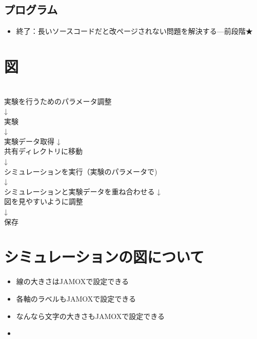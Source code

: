 	\subsection{プログラム}
		\begin{itemize}
		  \item 終了：長いソースコードだと改ページされない問題を解決する---前段階★
		\end{itemize}
\section{図}
 \ \\
 実験を行うためのパラメータ調整\\
 ↓\\
 実験\\
 ↓\\
 実験データ取得
 ↓\\ 
 共有ディレクトリに移動\\
 ↓\\
 シミュレーションを実行（実験のパラメータで)\\
 ↓\\
 シミュレーションと実験データを重ね合わせる
 ↓\\
 図を見やすいように調整\\
 ↓\\
 保存\\
 
 \section{シミュレーションの図について}
 \begin{itemize}
   \item 線の大きさはJAMOXで設定できる
   \item 各軸のラベルもJAMOXで設定できる
   \item なんなら文字の大きさもJAMOXで設定できる
   \item 
 \end{itemize}
 
